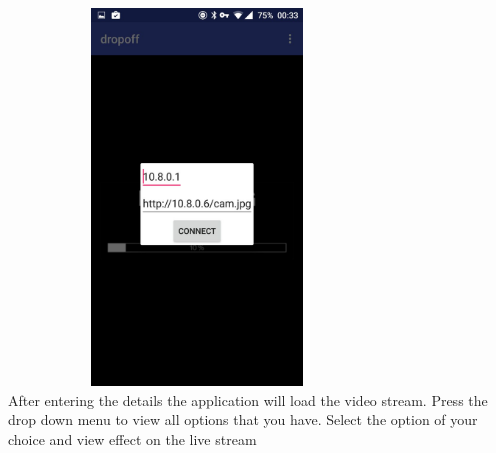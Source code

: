 \documentclass[a4paper,12pt]{article}
\begin{document}
	 \includegraphics[width=10cm,height=10cm,keepaspectratio]{./Pictures/app1.jpeg}\\ \newline
	 After entering the details the application will load the video stream. Press the drop down menu to view all options that you have. Select the option of your choice and view effect on the live stream\newline\newline 
\end{document}
